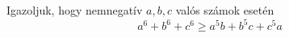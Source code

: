 Igazoljuk, hogy nemnegatív $a,b,c$ valós számok esetén
$$
   a^{6}+b^{6}+c^{6} \ge a^{5}b + b^{5}c+c^{5}a
$$
